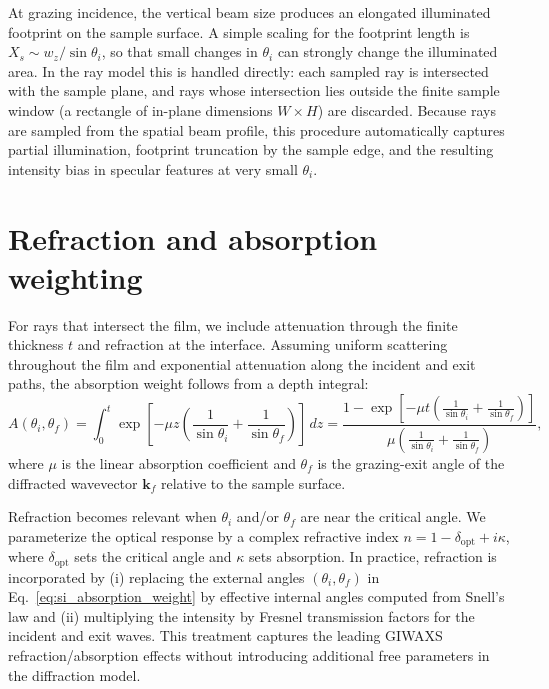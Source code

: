 \documentclass[12pt]{article}
\begin{document}
At grazing incidence, the vertical beam size produces an elongated illuminated footprint on the
sample surface. A simple scaling for the footprint length is $X_s\sim w_z/\sin\theta_i$, so that
small changes in $\theta_i$ can strongly change the illuminated area.
In the ray model this is handled directly: each sampled ray is intersected with the sample plane,
and rays whose intersection lies outside the finite sample window (a rectangle of in-plane
dimensions $W\times H$) are discarded. Because rays are sampled from the spatial beam profile,
this procedure automatically captures partial illumination, footprint truncation by the sample edge,
and the resulting intensity bias in specular features at very small $\theta_i$.

\section{Refraction and absorption weighting}
\label{sec:si_refraction_absorption}

For rays that intersect the film, we include attenuation through the finite thickness $t$ and
refraction at the interface. Assuming uniform scattering throughout the film and exponential
attenuation along the incident and exit paths, the absorption weight follows from a depth integral:
\begin{equation}
  A(\theta_i,\theta_f)=\int_{0}^{t}\exp\!\left[-\mu z\left(\frac{1}{\sin\theta_i}+\frac{1}{\sin\theta_f}\right)\right]\,dz
  =\frac{1-\exp\!\left[-\mu t\left(\frac{1}{\sin\theta_i}+\frac{1}{\sin\theta_f}\right)\right]}{\mu\left(\frac{1}{\sin\theta_i}+\frac{1}{\sin\theta_f}\right)},
  \label{eq:si_absorption_weight}
\end{equation}
where $\mu$ is the linear absorption coefficient and $\theta_f$ is the grazing-exit angle of the
diffracted wavevector $\mathbf{k}_f$ relative to the sample surface.

Refraction becomes relevant when $\theta_i$ and/or $\theta_f$ are near the critical angle.
We parameterize the optical response by a complex refractive index
$n=1-\delta_{\mathrm{opt}}+i\kappa$, where $\delta_{\mathrm{opt}}$ sets the critical angle and
$\kappa$ sets absorption. In practice, refraction is incorporated by (i) replacing the external
angles $(\theta_i,\theta_f)$ in Eq.~\eqref{eq:si_absorption_weight} by effective internal angles
computed from Snell's law and (ii) multiplying the intensity by Fresnel transmission factors for the
incident and exit waves. This treatment captures the leading GIWAXS refraction/absorption effects
without introducing additional free parameters in the diffraction model.
\end{document}
